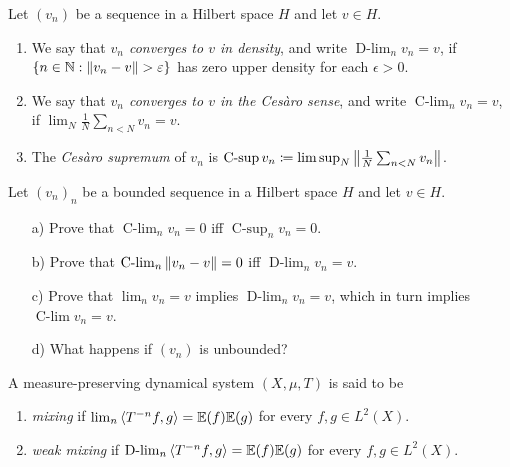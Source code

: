 \documentclass[reqno, twoside]{article}
\newcommand{\Clim}{\operatorname{C-lim}}
\newcommand{\Csup}{\operatorname{C-sup}}
\newcommand{\Dlim}{\operatorname{D-lim}}
\begin{document}
    \begin{definition*}
        Let $(v_n)$ be a sequence in a Hilbert space $H$ and let $v\in H$.
        \begin{enumerate}
            \item We say that \textit{$v_n$ converges to $v$ in density}, and write $\Dlim_nv_n=v$, if $\l\{n\in\N\st\l\|v_n-v\r\|>\epsilon\r\}$ has zero upper density for each $\epsilon>0$.
                \vspace{-0.05in}
            \item We say that \textit{$v_n$ converges to $v$ in the Cesàro sense}, and write $\Clim_nv_n=v$, if $\lim_N\frac{1}{N}\sum_{n<N}v_n=v$.
                \vspace{-0.05in}
            \item The \textit{Cesàro supremum} of $v_n$ is $\Csup v_n\coloneqq\limsup_N\l\|\frac{1}{N}\sum_{n<N}v_n\r\|$.
        \end{enumerate}
    \end{definition*}

    \begin{exercise}\label{equiv}
        Let $(v_n)_n$ be a bounded sequence in a Hilbert space $H$ and let $v\in H$. 
        \begin{enumerate}
            \item[a)] Prove that $\Clim_nv_n=0$ iff $\Csup_nv_n=0$.
                \vspace{-0.05in}
            \item[b)] Prove that $\Clim_n\l\|v_n-v\r\|=0$ iff $\Dlim_nv_n=v$.
                \vspace{-0.05in}
            \item[c)] Prove that $\lim_nv_n=v$ implies $\Dlim_nv_n=v$, which in turn implies $\Clim v_n=v$.
                \vspace{-0.05in}
            \item[d)] What happens if $(v_n)$ is unbounded?
        \end{enumerate}
    \end{exercise}

    \begin{definition*}
        A measure-preserving dynamical system $(X,\mu,T)$ is said to be
        \begin{enumerate}
            \item \textit{mixing} if $\lim_n\left\langle T^{-n}f,g\right\rangle=\mathbb{E}(f)\mathbb{E}(g)$ for every $f,g\in L^2(X)$.
                \vspace{-0.05in}
            \item \textit{weak mixing} if $\Dlim_n\l\langle T^{-n}f,g\r\rangle=\E(f)\E(g)$ for every $f,g\in L^2(X)$.
        \end{enumerate}
    \end{definition*}
\end{document}
